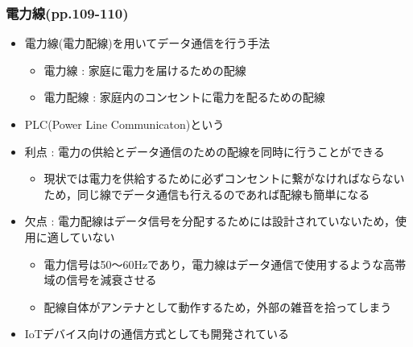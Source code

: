 \documentclass[a4paper]{ltjsarticle}
\begin{document}
		\subsubsection{電力線(pp.109-110)}
			\begin{itemize}
				\item 電力線(電力配線)を用いてデータ通信を行う手法
				\begin{itemize}
					\item 電力線 : 家庭に電力を届けるための配線
					\item 電力配線 : 家庭内のコンセントに電力を配るための配線
				\end{itemize}
				\item PLC(Power Line Communicaton)という
				\item 利点 : 電力の供給とデータ通信のための配線を同時に行うことができる
				\begin{itemize}
					\item 現状では電力を供給するために必ずコンセントに繋がなければならないため，同じ線でデータ通信も行えるのであれば配線も簡単になる
				\end{itemize}
				\item 欠点 : 電力配線はデータ信号を分配するためには設計されていないため，使用に適していない
				\begin{itemize}
					\item 電力信号は50〜60\si{Hz}であり，電力線はデータ通信で使用するような高帯域の信号を減衰させる
					\item 配線自体がアンテナとして動作するため，外部の雑音を拾ってしまう
				\end{itemize}
				\item IoTデバイス向けの通信方式としても開発されている\cite{plc}
			\end{itemize}
\end{document}
